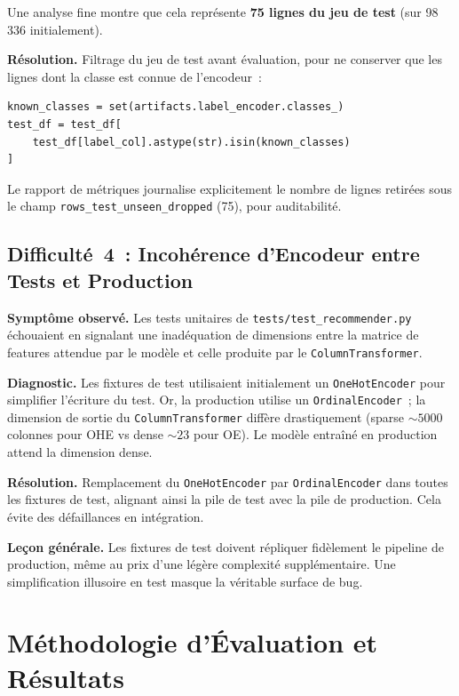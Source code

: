 \documentclass[11pt, a4paper]{article}
\begin{document}
Une analyse fine montre que cela représente
\textbf{75 lignes du jeu de test} (sur 98\,336 initialement).

\textbf{Résolution.} Filtrage du jeu de test avant évaluation, pour
ne conserver que les lignes dont la classe est connue de l'encodeur~:

\begin{lstlisting}[style=py]
known_classes = set(artifacts.label_encoder.classes_)
test_df = test_df[
    test_df[label_col].astype(str).isin(known_classes)
]
\end{lstlisting}

Le rapport de métriques journalise explicitement le nombre de lignes
retirées sous le champ \texttt{rows\_test\_unseen\_dropped} (75), pour
auditabilité.

\subsection{Difficulté~4~: Incohérence d'Encodeur entre Tests et Production}

\textbf{Symptôme observé.} Les tests unitaires de
\texttt{tests/test\_recommender.py} échouaient en signalant une
inadéquation de dimensions entre la matrice de features attendue par
le modèle et celle produite par le \texttt{ColumnTransformer}.

\textbf{Diagnostic.} Les fixtures de test utilisaient initialement un
\texttt{OneHotEncoder} pour simplifier l'écriture du test. Or, la
production utilise un \texttt{OrdinalEncoder}~; la dimension de sortie
du \texttt{ColumnTransformer} diffère drastiquement (sparse $\sim 5000$
colonnes pour OHE vs dense $\sim 23$ pour OE). Le modèle entraîné en
production attend la dimension dense.

\textbf{Résolution.} Remplacement du \texttt{OneHotEncoder} par
\texttt{OrdinalEncoder} dans toutes les fixtures de test, alignant
ainsi la pile de test avec la pile de production. Cela évite des
défaillances en intégration.

\textbf{Leçon générale.} Les fixtures de test doivent répliquer
fidèlement le pipeline de production, même au prix d'une légère
complexité supplémentaire. Une simplification illusoire en test
masque la véritable surface de bug.

\newpage
\section{Méthodologie d'Évaluation et Résultats}
\end{document}
